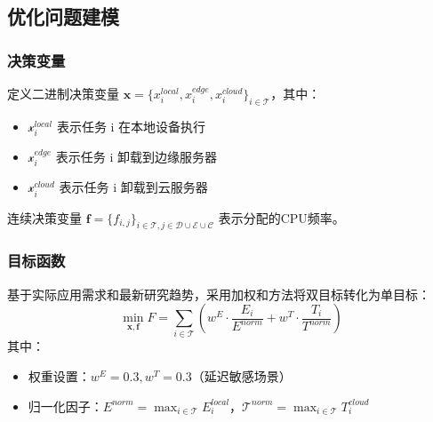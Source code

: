 \documentclass[conference]{IEEEtran}
\begin{document}
\subsection{优化问题建模}
\subsubsection{决策变量}
定义二进制决策变量 $\mathbf{x} = \{x_i^{local}, x_i^{edge}, x_i^{cloud}\}_{i \in \mathcal{T}}$，其中：
\begin{itemize}
    \item $\mathcal{x}_{i}^{local}$ 表示任务 i 在本地设备执行
    \item $\mathcal{x}_{i}^{edge}$ 表示任务 i 卸载到边缘服务器
    \item $\mathcal{x}_{i}^{cloud}$ 表示任务 i 卸载到云服务器
\end{itemize}
连续决策变量 $\mathbf{f} = \{f_{i,j}\}_{i \in \mathcal{T}, j \in \mathcal{D} \cup \mathcal{E} \cup \mathcal{C}}$ 表示分配的CPU频率。
\subsubsection{目标函数}
基于实际应用需求和最新研究趋势，采用加权和方法将双目标转化为单目标：
\begin{equation}
\min_{\mathbf{x}, \mathbf{f}} F = \sum_{i \in \mathcal{T}} \left( w^E \cdot \frac{E_i}{E^{norm}} + w^T \cdot \frac{T_i}{T^{norm}} \right)
\end{equation}
其中：
\begin{itemize}
    \item 权重设置：$\mathcal{}w^{E}=0.3, {w}^{T}=0.3$（延迟敏感场景）
    \item 归一化因子：$\mathcal{}E^{norm} = \max_{i \in \mathcal{T}} E_i^{local}$，$\mathcal{T}^{norm} = \max_{i \in \mathcal{T}} T_i^{cloud}$
\end{itemize}
\end{document}
